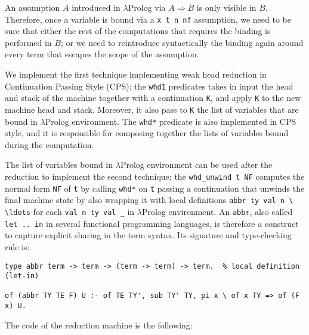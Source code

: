 An assumption $A$ introduced in $\lambda$Prolog via $A \Rightarrow B$ is only visible in $B$. Therefore, once a variable is bound via a \verb+x t n nf+ assumption, we need to be sure that either the rest of the computations that requires the binding is performed in $B$; or we need to reintroduce syntactically the binding again around every term that escapes the scope of the assumption.

We implement the first technique implementing weak head reduction in Continuation Passing Style (CPS): the \verb+whd1+ predicates takes in input the head and stack of the machine together with a continuation \verb+K+, and apply \verb+K+ to the new machine head and stack. Moreover, it also pass to \verb+K+ the list of variables that are bound in $\lambda$Prolog environment. The \verb+whd*+ predicate is also implemented in CPS style, and it is responsible for composing together the lists of variables bound during the computation.

The list of variables bound in $\lambda$Prolog environment can be used after the reduction to implement the second technique: the \verb+whd_unwind t NF+ computes the normal form \verb+NF+ of \verb+t+ by calling \verb+whd*+ on \verb+t+ passing a continuation that unwinds the final machine state by also wrapping it with local definitions \verb+abbr ty val n \ \ldots+ for each \verb+val n ty val _+ in $\lambda$Prolog environment. An \verb+abbr+, also called \verb+let .. in+ in several functional programming languages, is therefore a construct to capture explicit sharing in the term syntax. Its signature and type-checking rule is:

\begin{Verbatim}
type abbr term -> term -> (term -> term) -> term.  % local definition (let-in)

of (abbr TY TE F) U :- of TE TY', sub TY' TY, pi x \ of x TY => of (F x) U.
\end{Verbatim}

The code of the reduction machine is the following:

